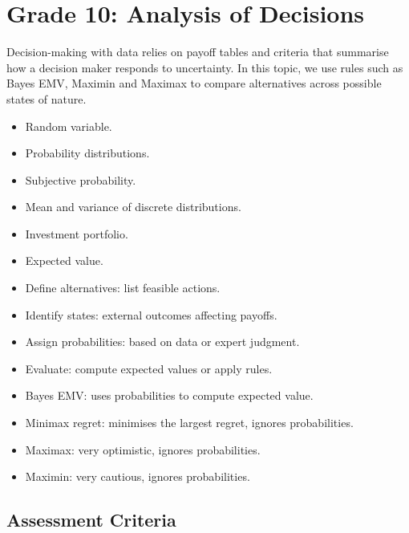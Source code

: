 \section{Grade 10: Analysis of Decisions}\label{sec:grade10-analysis}

Decision-making with data relies on payoff tables and criteria that summarise how a decision maker responds to uncertainty.
In this topic, we use rules such as Bayes EMV, Maximin and Maximax to compare alternatives across possible states of nature.

\begin{itemize}
	\item Random variable.
	\item Probability distributions.
	\item Subjective probability.
	\item Mean and variance of discrete distributions.
	\item Investment portfolio.
	\item Expected value.
\end{itemize}

\begin{itemize}
	\item Define alternatives: list feasible actions.
	\item Identify states: external outcomes affecting payoffs.
	\item Assign probabilities: based on data or expert judgment.
	\item Evaluate: compute expected values or apply rules.
\end{itemize}

\begin{itemize}
	\item Bayes EMV: uses probabilities to compute expected value.
	\item Minimax regret: minimises the largest regret, ignores probabilities.
	\item Maximax: very optimistic, ignores probabilities.
	\item Maximin: very cautious, ignores probabilities.
\end{itemize}

\subsection{Assessment Criteria}\label{sec:achievement-criteria}

